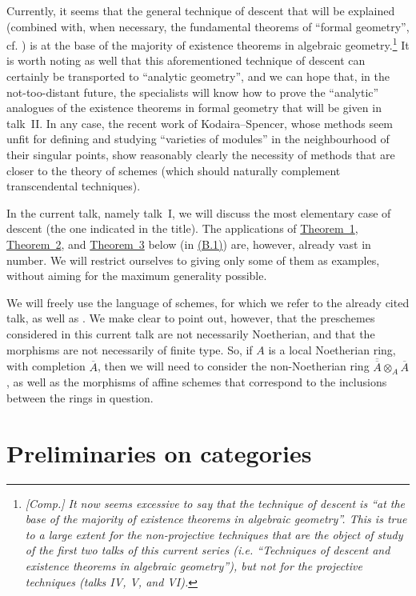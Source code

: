 \documentclass{article}
\newcommand{\oldpage}[1]{\marginpar{\footnotesize$\Big\vert$ \textit{p.~#1}}}
\begin{document}
Currently, it seems that the general technique of descent that will be explained (combined with, when necessary, the fundamental theorems of ``formal geometry'', cf. \cite{3}) is at the base of the majority of existence theorems in algebraic geometry.\footnote{\emph{[Comp.] It now seems excessive to say that the technique of descent is ``at the base of the majority of existence theorems in algebraic geometry''. This is true to a large extent for the non-projective techniques that are the object of study of the first two talks of this current series (i.e. ``Techniques of descent and existence theorems in algebraic geometry''), but not for the projective techniques (talks IV, V, and VI).}}
It is worth noting as well that this aforementioned technique of descent can certainly be transported to ``analytic geometry'', and we can hope that, in the not-too-distant future, the specialists will know how to prove the ``analytic'' analogues of the existence theorems in formal geometry that will be given in talk~II.
In any case, the recent work of Kodaira--Spencer, whose methods seem unfit for defining and studying ``varieties of modules'' in the neighbourhood of their singular points, show reasonably clearly the necessity of methods that are closer to the theory of schemes (which should naturally complement transcendental techniques).

In the current talk, namely talk~I, we will discuss the most elementary case of descent (the one indicated in the title).
The applications of \hyperref[theorem:B.1(1)]{Theorem~1}, \hyperref[theorem:B.1(2)]{Theorem~2}, and \hyperref[theorem:B.1(3)]{Theorem~3} below (in \hyperref[B.1]{(B.1)}) are, however, already vast in number. 
We will restrict ourselves to giving only some of them as examples, without aiming for the maximum generality possible.

We will freely use the language of schemes, for which we refer to the already cited talk, as well as \cite{2}.
We make clear to point out, however, that the preschemes considered in this current talk are not necessarily Noetherian, and that the
\oldpage{190-02}
morphisms are not necessarily of finite type.
So, if $A$ is a local Noetherian ring, with completion $\overline{A}$, then we will need to consider the non-Noetherian ring $\overline{\overline{A}}\otimes_A\overline{A}$, as well as the morphisms of affine schemes that correspond to the inclusions between the rings in question.


\part{Preliminaries on categories}
\label{A}
\end{document}
